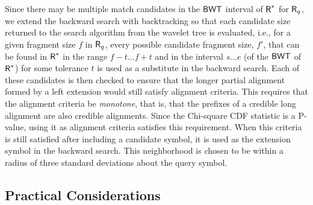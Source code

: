 Since there may be multiple match candidates in the $\mbox{\rm {\sf BWT}}$ interval of $\mbox{\rm {\sf R}}^*$ 
for $\mbox{\rm {\sf R}}_q$, we extend the backward search with backtracking so that each candidate size returned to the search algorithm from the wavelet tree is evaluated, i.e., for a given fragment size $f$ in $\mbox{\rm {\sf R}}_q$, every possible candidate fragment size, $f'$, that can be found in $\mbox{\rm {\sf R}}^*$ in the range $f - t \ldots f + t$ and in the interval $s \ldots e$ (of the $\mbox{\rm {\sf BWT}}$ of $\mbox{\rm {\sf R}}^*$) for some tolerance $t$ is used as a substitute in the backward search. Each of these candidates is then checked to ensure that the longer partial alignment formed by a left extension would still satisfy alignment criteria.  This requires that the alignment criteria be \emph{monotone}, that is, that the prefixes of a credible long alignment are also credible alignments.  Since the Chi-square CDF statistic is a P-value, using it as alignment criteria satisfies this requirement.   When this criteria is still satisfied after including a candidate symbol, it is used as the extension symbol in the backward search.  This neighborhood is chosen to be within a radius of three standard deviations about the query symbol. 
 
 




\subsection{Practical Considerations}

